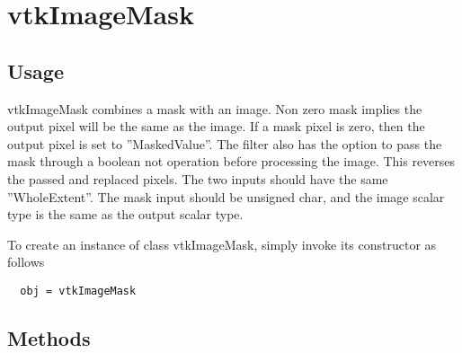 \section{vtkImageMask}

\subsection{Usage}

 vtkImageMask combines a mask with an image.  Non zero mask
 implies the output pixel will be the same as the image.
 If a mask pixel is zero,  then the output pixel
 is set to ''MaskedValue''.  The filter also has the option to pass
 the mask through a boolean not operation before processing the image.
 This reverses the passed and replaced pixels.
 The two inputs should have the same ''WholeExtent''.
 The mask input should be unsigned char, and the image scalar type
 is the same as the output scalar type.

To create an instance of class vtkImageMask, simply
invoke its constructor as follows
\begin{verbatim}
  obj = vtkImageMask
\end{verbatim}
\subsection{Methods}

